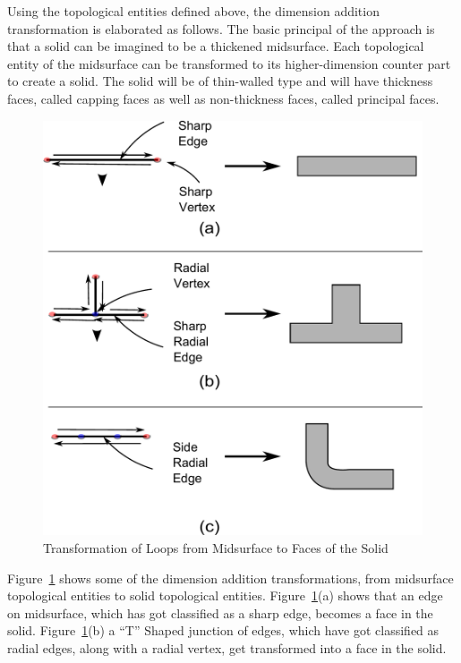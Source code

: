 

	
Using the topological entities defined above, the dimension addition transformation is elaborated as follows.
%	
The basic principal of the approach is that a solid can be imagined to be a thickened midsurface. Each topological entity of the midsurface can be transformed to its higher-dimension counter part to create a solid. The solid will be of thin-walled type and will have thickness faces, called capping faces as well as non-thickness faces, called principal faces.



	\begin{figure}[!h]
	\centering     %
	\includegraphics[width=0.62\linewidth]{../Common/images/NonManifoldLoopsToFaces2.pdf}
	\caption{Transformation of Loops from Midsurface to Faces of the Solid}
	\label{fig:topoval:loopstofaces}
	\end{figure}

	
Figure~\ref{fig:topoval:loopstofaces} shows some of the dimension addition transformations, from midsurface topological entities to solid topological entities. Figure~\ref{fig:topoval:loopstofaces}(a) shows that an edge on midsurface, which has got classified as a sharp edge, becomes a face in the solid.  Figure~\ref{fig:topoval:loopstofaces}(b) a ``T'' Shaped junction of edges, which have got classified as radial edges, along with a radial vertex, get transformed into a face in the solid.

